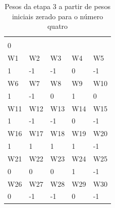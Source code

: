 \documentclass[11pt]{article}
\begin{document}
\begin{table}[]
\centering
\caption{Pesos da etapa 3 a partir de pesos iniciais zerado para o número quatro}
\label{tab:wp4z_3}
\begin{tabular}{lllll}
\cellcolor[HTML]{000000}{\color[HTML]{FFFFFF} W0} &                            &                            &                            &                            \\
0                                                 &                            &                            &                            &                            \\
\rowcolor[HTML]{000000}
{\color[HTML]{FFFFFF} W1}                         & {\color[HTML]{FFFFFF} W2}  & {\color[HTML]{FFFFFF} W3}  & {\color[HTML]{FFFFFF} W4}  & {\color[HTML]{FFFFFF} W5}  \\
1                                                 & -1                         & -1                         & 0                          & -1                         \\
\rowcolor[HTML]{000000}
{\color[HTML]{FFFFFF} W6}                         & {\color[HTML]{FFFFFF} W7}  & {\color[HTML]{FFFFFF} W8}  & {\color[HTML]{FFFFFF} W9}  & {\color[HTML]{FFFFFF} W10} \\
1                                                 & -1                         & 0                          & 1                          & 0                          \\
\rowcolor[HTML]{000000}
{\color[HTML]{FFFFFF} W11}                        & {\color[HTML]{FFFFFF} W12} & {\color[HTML]{FFFFFF} W13} & {\color[HTML]{FFFFFF} W14} & {\color[HTML]{FFFFFF} W15} \\
1                                                 & -1                         & -1                         & 0                          & -1                         \\
\rowcolor[HTML]{000000}
{\color[HTML]{FFFFFF} W16}                        & {\color[HTML]{FFFFFF} W17} & {\color[HTML]{FFFFFF} W18} & {\color[HTML]{FFFFFF} W19} & {\color[HTML]{FFFFFF} W20} \\
1                                                 & 1                          & 1                          & 1                          & -1                         \\
\rowcolor[HTML]{000000}
{\color[HTML]{FFFFFF} W21}                        & {\color[HTML]{FFFFFF} W22} & {\color[HTML]{FFFFFF} W23} & {\color[HTML]{FFFFFF} W24} & {\color[HTML]{FFFFFF} W25} \\
0                                                 & 0                          & 0                          & 1                          & -1                         \\
\rowcolor[HTML]{000000}
{\color[HTML]{FFFFFF} W26}                        & {\color[HTML]{FFFFFF} W27} & {\color[HTML]{FFFFFF} W28} & {\color[HTML]{FFFFFF} W29} & {\color[HTML]{FFFFFF} W30} \\
0                                                 & -1                         & -1                         & 0                          & -1
\end{tabular}
\end{table}
\end{document}
